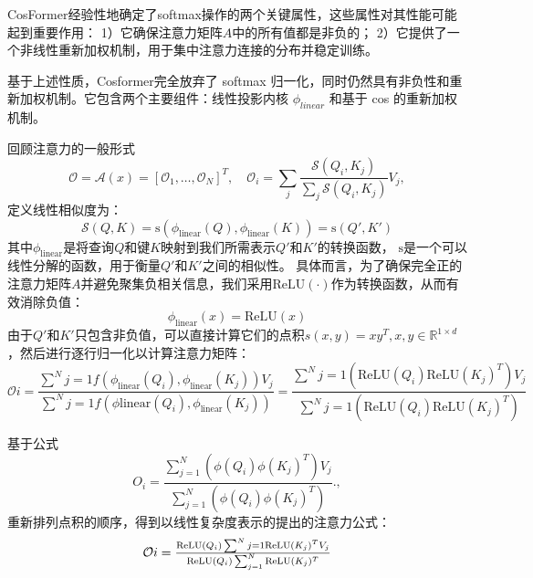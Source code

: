 \label{subsec:cosformer}
CosFormer\cite{zhen2022cosformer}经验性地确定了softmax操作的两个关键属性，这些属性对其性能可能起到重要作用：
1）它确保注意力矩阵$A$中的所有值都是非负的；
2）它提供了一个非线性重新加权机制，用于集中注意力连接的分布并稳定训练\cite{titsias2016one}。

基于上述性质，Cosformer完全放弃了 softmax 归一化，同时仍然具有非负性和重新加权机制。它包含两个主要组件：线性投影内核 $\phi_{linear}$ 和基于 cos 的重新加权机制。

回顾注意力的一般形式
\begin{equation}
   \mathcal{O} = \mathcal{A}(x) = \left[\mathcal{O}_1,\hdots, \mathcal{O}_N \right]^T, \quad \mathcal{O}_i
 = \sum_j \frac{\mathcal{S}(Q_i,K_j)}{\sum_j \mathcal{S}(Q_i,K_j)}V_j,
\end{equation}
定义线性相似度为：
\begin{equation}
\mathcal{S}(Q,K)=\mathrm{s}(\phi_{\text{linear}}(Q),\phi_{\text{linear}}(K))=\mathrm{s}(Q',K')
\label{eq:qk}
\end{equation}
其中$\phi_{\text{linear}}$是将查询$Q$和键$K$映射到我们所需表示$Q'$和$K'$的转换函数，
$\mathrm{s}$是一个可以线性分解的函数，用于衡量$Q'$和$K'$之间的相似性。
具体而言，为了确保完全正的注意力矩阵$A$并避免聚集负相关信息，我们采用$\mathrm{ReLU}(\cdot)$作为转换函数，从而有效消除负值：
\begin{equation}
\textstyle{
\phi_{\text{linear}}(x) = \mathrm{ReLU}(x)
}
\end{equation}
由于$Q'$和$K'$只包含非负值，可以直接计算它们的点积$s(x,y) =xy^T, x,y\in \mathbb R^{1\times d}$，然后进行逐行归一化以计算注意力矩阵：
\begin{equation}
\textstyle{
\mathcal{O}i = \frac{\sum^{N}{j=1}f(\phi_{\text{linear}} (Q_i), \phi_{\text{linear}}({K_j})) V_j}{\sum^{N}{j=1}f(\phi{\text{linear}} (Q_i), \phi_{\text{linear}}({K_j}))} = \frac{\sum^{N}{j=1}(\mathrm{ReLU} (Q_i) \mathrm{ReLU}({K_j})^T) V_j}{\sum^{N}{j=1}(\mathrm{ReLU} (Q_i) \mathrm{ReLU}({K_j})^T)}
}
\end{equation}

基于公式
\begin{equation}
\textstyle{
    O_i = \frac{\sum^{N}_{j=1}(\phi (Q_i) \phi({K_j})^T) V_j}{\sum^{N}_{j=1}(\phi (Q_i) \phi({K_j})^T)}.
\label{eq: rewrite att},
}\end{equation}
重新排列点积的顺序，得到以线性复杂度表示的提出的注意力公式：
\begin{equation}
\textstyle{
\label{eq: relu attention}
\mathcal{O}i = \frac{\mathrm{ReLU} (Q_i) \sum^{N}{j=1}\mathrm{ReLU}({K_j})^T V_j}{\mathrm{ReLU} (Q_i)\sum^{N}_{j=1} \mathrm{ReLU}({K_j})^T}
}
\end{equation}

